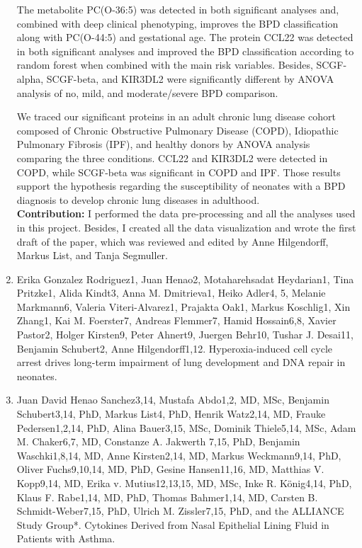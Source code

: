 \begin{enumerate}
The metabolite PC(O-36:5) was detected in both significant analyses and, combined with deep clinical phenotyping, improves the BPD classification along with PC(O-44:5) and gestational age. The protein CCL22 was detected in both significant analyses and improved the BPD classification according to random forest when combined with the main risk variables. Besides, SCGF-alpha, SCGF-beta, and KIR3DL2 were significantly different by ANOVA analysis of no, mild, and moderate/severe BPD comparison.

We traced our significant proteins in an adult chronic lung disease cohort composed of Chronic Obstructive Pulmonary Disease (COPD), Idiopathic Pulmonary Fibrosis (IPF), and healthy donors by ANOVA analysis comparing the three conditions. CCL22 and KIR3DL2 were detected in COPD, while SCGF-beta was significant in COPD and IPF. Those results support the hypothesis regarding the susceptibility of neonates with a BPD diagnosis to develop chronic lung diseases in adulthood.\\

	\textbf{Contribution:} I performed the data pre-processing and all the analyses used in this project. Besides, I created all the data visualization and wrote the first draft of the paper, which was reviewed and edited by Anne Hilgendorff, Markus List, and Tanja Segmuller.
	
	\item Erika Gonzalez Rodriguez1, Juan Henao2, Motaharehsadat Heydarian1, Tina Pritzke1, Alida Kindt3, Anna M. Dmitrieva1, Heiko Adler4, 5, Melanie Markmann6, Valeria Viteri-Alvarez1, Prajakta Oak1, Markus Koschlig1, Xin Zhang1, Kai M. Foerster7, Andreas Flemmer7, Hamid Hossain6,8, Xavier Pastor2, Holger Kirsten9, Peter Ahnert9, Juergen Behr10, Tushar J. Desai11, Benjamin Schubert2, Anne Hilgendorff1,12. Hyperoxia-induced cell cycle arrest drives long-term impairment of lung development and DNA repair in neonates.
	
	\item 	Juan David Henao Sanchez3,14, Mustafa Abdo1,2, MD, MSc, Benjamin Schubert3,14, PhD, Markus List4, PhD, Henrik Watz2,14, MD, Frauke Pedersen1,2,14, PhD, Alina Bauer3,15, MSc, Dominik Thiele5,14, MSc, Adam M. Chaker6,7, MD, Constanze A. Jakwerth 7,15, PhD, Benjamin Waschki1,8,14, MD, Anne Kirsten2,14, MD, Markus Weckmann9,14, PhD, Oliver Fuchs9,10,14, MD, PhD, Gesine Hansen11,16, MD, Matthias V. Kopp9,14, MD, Erika v. Mutius12,13,15, MD, MSc, Inke R. König4,14, PhD, Klaus F.  Rabe1,14, MD, PhD, Thomas Bahmer1,14, MD, Carsten B. Schmidt-Weber7,15, PhD, Ulrich M. Zissler7,15, PhD, and the ALLIANCE Study Group*. Cytokines Derived from Nasal Epithelial Lining Fluid in Patients with Asthma.
	

\end{enumerate}
